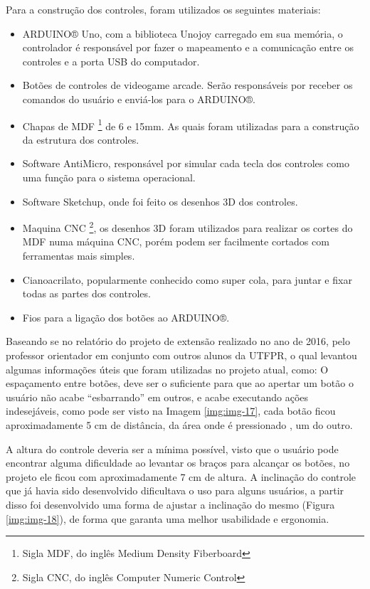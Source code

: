 \documentclass[
	12pt,			%
	openright,		%
	oneside,			%
	a4paper,			%
	chapter=TITLE,		%
	english,			%
	brazil,			%
	]{abntex2}
\begin{document}
Para a construção dos controles, foram utilizados os seguintes materiais:
\begin{itemize}
\item ARDUINO® Uno, com a biblioteca Unojoy carregado em sua memória, o controlador é responsável por fazer o mapeamento e a comunicação entre os controles e a porta USB do computador.
\item Botões de controles de videogame arcade. Serão responsáveis por receber os comandos do usuário e enviá-los para o ARDUINO®.
\item Chapas de MDF \footnote{Sigla MDF, do inglês Medium Density Fiberboard} de 6 e 15mm. As quais foram utilizadas para a construção da estrutura dos controles.
\item Software AntiMicro, responsável por simular cada tecla dos controles como uma função para o sistema operacional.
\item Software Sketchup, onde foi feito os desenhos 3D dos controles.
\item Maquina CNC \footnote{Sigla CNC, do inglês Computer Numeric Control}, os desenhos 3D foram utilizados para realizar os cortes do MDF numa máquina CNC, porém podem ser facilmente cortados com ferramentas mais simples.
\item Cianoacrilato, popularmente conhecido como super cola, para juntar e fixar todas as partes dos controles.
\item Fios para a ligação dos botões ao ARDUINO®.
\end{itemize}

Baseando se no relatório do projeto de extensão realizado no ano de 2016, pelo professor orientador em conjunto com outros alunos da UTFPR, o qual levantou algumas informações úteis que foram utilizadas no projeto atual, como:
O espaçamento entre botões, deve ser o suficiente para que ao apertar um botão o usuário não acabe “esbarrando” em outros, e acabe executando ações indesejáveis, como pode ser visto na Imagem \ref{img:img-17}, cada botão ficou aproximadamente 5 cm de distância, da área onde é pressionado , um do outro.

A altura do controle deveria ser a mínima possível, visto que o usuário pode encontrar alguma dificuldade ao levantar os braços para alcançar os botões, no projeto ele ficou com aproximadamente 7 cm de altura.
A inclinação do controle que já havia sido desenvolvido dificultava o uso para alguns usuários, a partir disso foi desenvolvido uma forma de ajustar a inclinação do mesmo (Figura \ref{img:img-18}), de forma que garanta uma melhor usabilidade e ergonomia.
\end{document}
